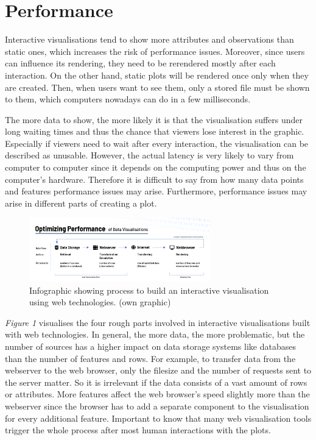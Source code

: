 \documentclass[11pt]{article}
\begin{document}
\section{Performance}

Interactive visualisations tend to show more attributes and observations than static ones, which increases the risk of performance issues. Moreover, since users can influence its rendering, they need to be rerendered mostly after each interaction. On the other hand, static plots will be rendered once only when they are created. Then, when users want to see them, only a stored file must be shown to them, which computers nowadays can do in a few milliseconds.

The more data to show, the more likely it is that the visualisation suffers under long waiting times and thus the chance that viewers lose interest in the graphic. Especially if viewers need to wait after every interaction, the visualisation can be described as unusable. However, the actual latency is very likely to vary from computer to computer since it depends on the computing power and thus on the computer's hardware. Therefore it is difficult to say from how many data points and features performance issues may arise. Furthermore, performance issues may arise in different parts of creating a plot.

\begin{figure}
    \centering
    \includegraphics[width=0.7\textwidth]{./performance.png}
    \caption{Infographic showing process to build an interactive visualisation using web technologies. (own graphic)}
\end{figure}

\textit{Figure 1} visualises the four rough parts involved in interactive visualisations built with web technologies. In general, the more data, the more problematic, but the number of sources has a higher impact on data storage systems like databases than the number of features and rows. For example, to transfer data from the webserver to the web browser, only the filesize and the number of requests sent to the server matter. So it is irrelevant if the data consists of a vast amount of rows or attributes. More features affect the web browser's speed slightly more than the webserver since the browser has to add a separate component to the visualisation for every additional feature. Important to know that many web visualisation tools trigger the whole process after most human interactions with the plots.
\end{document}
